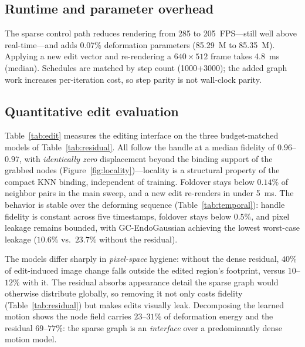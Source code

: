 \documentclass[ASNA,twocolumn]{USG} %
\begin{document}
\subsection{Runtime and parameter overhead}

The sparse control path reduces rendering from 285 to 205~FPS---still well above real-time---and adds 0.07\% deformation parameters (85.29~M to 85.35~M). Applying a new edit vector and re-rendering a $640\times512$ frame takes 4.8~ms (median). Schedules are matched by step count (1000+3000); the added graph work increases per-iteration cost, so step parity is not wall-clock parity.

\subsection{Quantitative edit evaluation}\label{sec:edit_eval}

Table~\ref{tab:edit} measures the editing interface on the three budget-matched models of Table~\ref{tab:residual}. All follow the handle at a median fidelity of $0.96$--$0.97$, with \emph{identically zero} displacement beyond the binding support of the grabbed nodes (Figure~\ref{fig:locality})---locality is a structural property of the compact KNN binding, independent of training. Foldover stays below $0.14\%$ of neighbor pairs in the main sweep, and a new edit re-renders in under 5~ms. The behavior is stable over the deforming sequence (Table~\ref{tab:temporal}): handle fidelity is constant across five timestamps, foldover stays below $0.5\%$, and pixel leakage remains bounded, with GC-EndoGaussian achieving the lowest worst-case leakage ($10.6\%$ vs.\ $23.7\%$ without the residual).

The models differ sharply in \emph{pixel-space} hygiene: without the dense residual, $40\%$ of edit-induced image change falls outside the edited region's footprint, versus $10$--$12\%$ with it. The residual absorbs appearance detail the sparse graph would otherwise distribute globally, so removing it not only costs fidelity (Table~\ref{tab:residual}) but makes edits visually leak. Decomposing the learned motion shows the node field carries $23$--$31\%$ of deformation energy and the residual $69$--$77\%$: the sparse graph is an \emph{interface} over a predominantly dense motion model.
\end{document}
